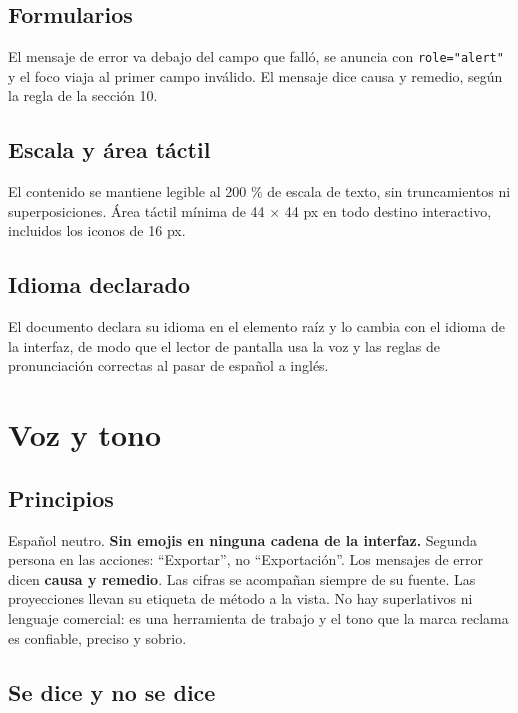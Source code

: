 \subsection{Formularios}

El mensaje de error va debajo del campo que falló, se anuncia con \texttt{role="alert"} y el foco viaja al primer campo inválido. El mensaje dice causa y remedio, según la regla de la sección 10.

\subsection{Escala y área táctil}

El contenido se mantiene legible al 200 \% de escala de texto, sin truncamientos ni superposiciones. Área táctil mínima de 44 × 44 px en todo destino interactivo, incluidos los iconos de 16 px.

\subsection{Idioma declarado}

El documento declara su idioma en el elemento raíz y lo cambia con el idioma de la interfaz, de modo que el lector de pantalla usa la voz y las reglas de pronunciación correctas al pasar de español a inglés.

\section{Voz y tono}

\subsection{Principios}

Español neutro. \textbf{Sin emojis en ninguna cadena de la interfaz.} Segunda persona en las acciones: \enquote{Exportar}, no \enquote{Exportación}. Los mensajes de error dicen \textbf{causa y remedio}. Las cifras se acompañan siempre de su fuente. Las proyecciones llevan su etiqueta de método a la vista. No hay superlativos ni lenguaje comercial: es una herramienta de trabajo y el tono que la marca reclama es confiable, preciso y sobrio.

\subsection{Se dice y no se dice}

